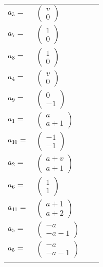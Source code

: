 \documentclass[1p]{elsarticle_modified}
\theoremstyle{definition}
\begin{document}
\begin{tabular}{m{7pt} m{180pt} m{7pt} m{180pt} }
\flushright $a_{3}=$&$\begin{pmatrix}v\\0\end{pmatrix}$ \\
\flushright $a_{7}=$&$\begin{pmatrix}1\\0\end{pmatrix}$ \\
\flushright $a_{8}=$&$\begin{pmatrix}1\\0\end{pmatrix}$ \\
\flushright $a_{4}=$&$\begin{pmatrix}v\\0\end{pmatrix}$ \\
\flushright $a_{9}=$&$\begin{pmatrix}0\\-1\end{pmatrix}$ \\
\flushright $a_{1}=$&$\begin{pmatrix}a\\a+1\end{pmatrix}$ \\
\flushright $a_{10}=$&$\begin{pmatrix}-1\\-1\end{pmatrix}$ \\
\flushright $a_{2}=$&$\begin{pmatrix}a+v\\a+1\end{pmatrix}$ \\
\flushright $a_{6}=$&$\begin{pmatrix}1\\1\end{pmatrix}$ \\
\flushright $a_{11}=$&$\begin{pmatrix}a+1\\a+2\end{pmatrix}$ \\
\flushright $a_{5}=$&$\begin{pmatrix}- a\\- a-1\end{pmatrix}$\\ \flushright $a_{5}=$&$\begin{pmatrix}- a\\- a-1\end{pmatrix}$\\&\end{tabular}
\end{document}
